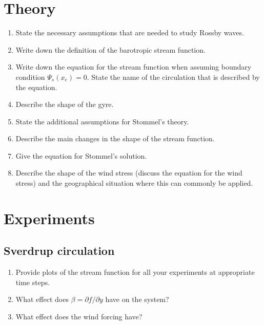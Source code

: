 \begin{question}
\section*{Theory}

\begin{enumerate}
\item State the necessary assumptions that are needed to study Rossby waves. 

\item Write down the definition of the barotropic stream function. 

\item Write down the equation for the stream function when assuming boundary condition $\Psi_s(x_e)=0$. State the name of the circulation that is described by the equation. 

\item Describe the shape of the gyre. 

\item State the additional assumptions for Stommel’s theory. 

\item Describe the main changes in the shape of the stream function. 

\item Give the equation for Stommel’s solution. 

\item Describe the shape of the wind stress (discuss the equation for the wind stress) and the geographical situation where this can commonly be applied. 
\end{enumerate}

\section*{Experiments}
\subsection*{Sverdrup circulation}

\begin{enumerate}
\item Provide plots of the stream function for all your experiments at appropriate time steps.

\item What effect does $\beta = \partial f / \partial y$ have on the system? 

\item What effect does the wind forcing have? 


\end{enumerate}
\end{question}
